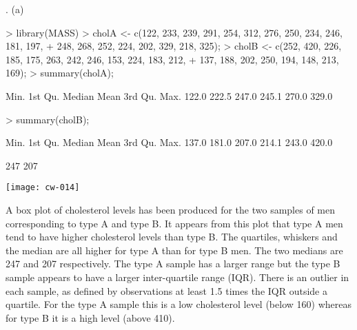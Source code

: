 \documentclass[a4paper,11pt]{article}
\begin{document}
. (a)
\begin{Schunk}
\begin{Sinput}
> library(MASS)
> cholA <- c(122, 233, 239, 291, 254, 312, 276, 250, 234, 246, 181, 197,
+            248, 268, 252, 224, 202, 329, 218, 325);
> cholB <- c(252, 420, 226, 185, 175, 263, 242, 246, 153, 224, 183, 212,
+            137, 188, 202, 250, 194, 148, 213, 169);
> summary(cholA);
\end{Sinput}
\begin{Soutput}
   Min. 1st Qu.  Median    Mean 3rd Qu.    Max. 
  122.0   222.5   247.0   245.1   270.0   329.0 
\end{Soutput}
\begin{Sinput}
> summary(cholB);
\end{Sinput}
\begin{Soutput}
   Min. 1st Qu.  Median    Mean 3rd Qu.    Max. 
  137.0   181.0   207.0   214.1   243.0   420.0 
\end{Soutput}
\begin{Soutput}
[1] 247 207
\end{Soutput}
\end{Schunk}
\texttt{[image: cw-014]}

A box plot of cholesterol levels has been produced for the two samples
of men corresponding to type A and type B. It appears from this plot
that type A men tend to have higher cholesterol levels than type
B. The quartiles, whiskers and the median are all higher for type A
than for type B men. The two medians are 247 and 207
respectively. The type A sample has a larger range but the type B
sample appears to have a larger inter-quartile range (IQR). There is an
outlier in each sample, as defined by observations at least 1.5 times
the IQR outside a quartile. For the type A sample this is a low
cholesterol level (below 160) whereas for type B it is a high level
(above 410).
\end{document}
